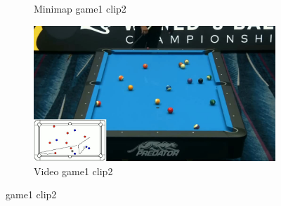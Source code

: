 \begin{figure}[H]
\begin{subfigure}[b]{0.48\textwidth}
    	\caption{Minimap game1 clip2}
    	\label{fig: game1_clip2_minimap}
    \end{subfigure}
    \begin{subfigure}[b]{0.48\textwidth}
    	\centering
    	\includegraphics[width=\textwidth]{images/Video/game1_clip2_video.jpg}
    	\caption{Video game1 clip2}
    	\label{fig: game1_clip2_video}
    \end{subfigure}
    
	\caption{game1 clip2}
\end{figure}

